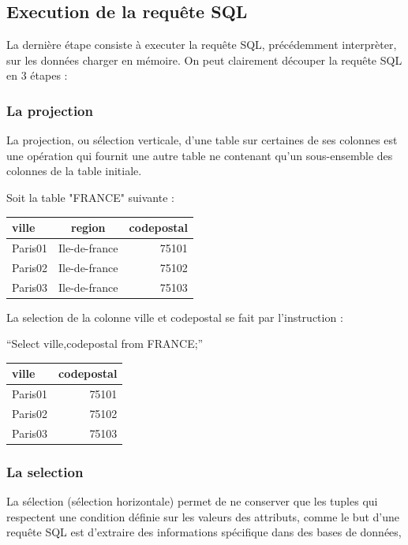\documentclass[oneside,13pt,a4paper]{report}
\begin{document}
\subsection{Execution de la requête SQL}

La dernière étape consiste à executer la requête SQL, précédemment interprèter, sur les données charger en mémoire.
On peut clairement découper la requête SQL en 3 étapes :

\subsubsection{La projection}

La projection, ou sélection verticale, d'une table sur certaines de ses colonnes est une opération qui fournit une autre table ne contenant qu'un sous-ensemble des colonnes de la table initiale.

Soit la table "FRANCE" suivante :

\begin{tabular}{|l|c|r|}
	\hline
	ville   & region        & codepostal
	\\
	\hline
	Paris01 & Ile-de-france & 75101      \\
	Paris02 & Ile-de-france & 75102      \\
	Paris03 & Ile-de-france & 75103      \\
	\hline
\end{tabular}

La selection de la colonne ville et codepostal se fait par l'instruction :

\enquote{Select ville,codepostal from FRANCE;}

\begin{tabular}{|l|r|}
	\hline
	ville & codepostal
	\\
	\hline
	Paris01 & 75101  \\
	Paris02 & 75102 \\
	Paris03 & 75103 \\
	\hline
\end{tabular}

\subsubsection{La selection}

La sélection (sélection horizontale) permet de ne conserver que les tuples qui respectent une condition définie sur les valeurs des attributs,
comme le but d'une requête SQL est d'extraire des informations spécifique dans des bases de données,
\end{document}
